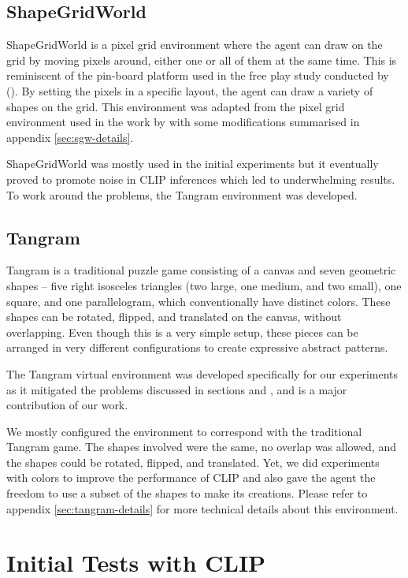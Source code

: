 \subsection{ShapeGridWorld}
\label{sec:sgw}
ShapeGridWorld is a pixel grid environment where the agent can draw on the grid by moving pixels around, either one or all of them at the same time.
This is reminiscent of the pin-board platform used in the free play study conducted by \citet{diggs} ().
By setting the pixels in a specific layout, the agent can draw a variety of shapes on the grid.
This environment was adapted from the pixel grid environment used in the work by \citet{rair} with some modifications summarised in appendix \ref{sec:sgw-details}.

ShapeGridWorld was mostly used in the initial experiments but it eventually proved to promote noise in CLIP inferences which led to underwhelming results.
To work around the problems, the Tangram environment was developed.

\subsection{Tangram}
\label{sec:tangram}
Tangram is a traditional puzzle game consisting of a canvas and seven geometric shapes -- five right isosceles triangles (two large, one medium, and two small), one square, and one parallelogram, which conventionally have distinct colors.
These shapes can be rotated, flipped, and translated on the canvas, without overlapping.
Even though this is a very simple setup, these pieces can be arranged in very different configurations to create expressive abstract patterns.

The Tangram virtual environment was developed specifically for our experiments as it mitigated the problems discussed in sections  and , and is a major contribution of our work.

We mostly configured the environment to correspond with the traditional Tangram game.
The shapes involved were the same, no overlap was allowed, and the shapes could be rotated, flipped, and translated.
Yet, we did experiments with colors to improve the performance of CLIP and also gave the agent the freedom to use a subset of the shapes to make its creations.
Please refer to appendix \ref{sec:tangram-details} for more technical details about this environment.

\section{Initial Tests with CLIP}
\label{sec:clip-custom}

